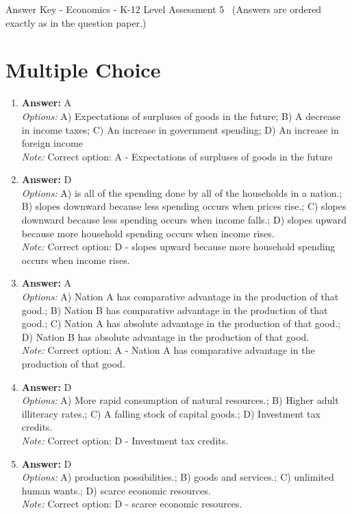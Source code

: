 \documentclass[12pt]{article}
\begin{document}
\begin{center}
Answer Key - Economics - K-12 Level Assessment 5 \
\small (Answers are ordered exactly as in the question paper.)
\end{center}

\section*{Multiple Choice}
\begin{enumerate}[label=\arabic*.]
\item \textbf{Answer:} A
\\ \textit{Options:} A) Expectations of surpluses of goods in the future; B) A decrease in income taxes; C) An increase in government spending; D) An increase in foreign income
\\ \textit{Note:} Correct option: A - Expectations of surpluses of goods in the future
\item \textbf{Answer:} D
\\ \textit{Options:} A) is all of the spending done by all of the households in a nation.; B) slopes downward because less spending occurs when prices rise.; C) slopes downward because less spending occurs when income falls.; D) slopes upward because more household spending occurs when income rises.
\\ \textit{Note:} Correct option: D - slopes upward because more household spending occurs when income rises.
\item \textbf{Answer:} A
\\ \textit{Options:} A) Nation A has comparative advantage in the production of that good.; B) Nation B has comparative advantage in the production of that good.; C) Nation A has absolute advantage in the production of that good.; D) Nation B has absolute advantage in the production of that good.
\\ \textit{Note:} Correct option: A - Nation A has comparative advantage in the production of that good.
\item \textbf{Answer:} D
\\ \textit{Options:} A) More rapid consumption of natural resources.; B) Higher adult illiteracy rates.; C) A falling stock of capital goods.; D) Investment tax credits.
\\ \textit{Note:} Correct option: D - Investment tax credits.
\item \textbf{Answer:} D
\\ \textit{Options:} A) production possibilities.; B) goods and services.; C) unlimited human wants.; D) scarce economic resources.
\\ \textit{Note:} Correct option: D - scarce economic resources.
\end{enumerate}
\end{document}

